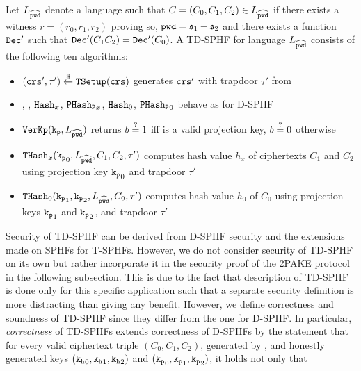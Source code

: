 \begin{definition}[TD-SPHF]\label{def:tdsphf}
Let $L_{\widehat{\mathtt{pwd}}}$ denote a language such that $C=(C_0,C_1,C_2)\in L_{\widehat{\mathtt{pwd}}}$ if there exists a witness $r=(r_0,r_1,r_2)$ proving so, $\mathtt{pwd}=\mathfrak{s}_1+\mathfrak{s}_2$ and there exists a function $\mathtt{Dec}'$ such that $\mathtt{Dec}'(C_1 C_2)=\mathtt{Dec}'(C_0)$.
A \ac{TD-SPHF} for language $L_{\widehat{\mathtt{pwd}}}$ consists of the following ten algorithms:

\begin{itemize}
	\item $(\mathtt{crs}',\tau')\stackrel{\$}{\gets}\mathtt{TSetup}(\mathtt{crs})$ generates $\mathtt{crs}'$ with trapdoor $\tau'$ from \crs

	\item \HKGen, \PKGen, $\mathtt{Hash}_x$, $\mathtt{PHash_P}_x$, $\mathtt{Hash}_0$, $\mathtt{PHash_P}_0$ behave as for \ac{D-SPHF}
	
	\item $\mathtt{VerKp}(\mathtt{k_p},L_{\widehat{\mathtt{pwd}}})$ returns $b\stackrel{?}{=} 1$ iff \hp is a valid projection key, $b\stackrel{?}{=} 0$ otherwise
	
	\item $\mathtt{THash}_x(\mathtt{k_p}_0,L_{\widehat{\mathtt{pwd}}},C_1,C_2,\tau')$ computes hash value $h_x$ of ciphertexts $C_1$ and $C_2$ using projection key $\mathtt{k_p}_0$ and trapdoor $\tau'$
	
	\item $\mathtt{THash}_0(\mathtt{k_p}_1,\mathtt{k_p}_2,L_{\widehat{\mathtt{pwd}}},C_0,\tau')$ computes hash value $h_0$ of $C_0$ using projection keys $\mathtt{k_p}_1$ and $\mathtt{k_p}_2$, and trapdoor $\tau'$
\end{itemize}
\end{definition}


\noindent
Security of \ac{TD-SPHF} can be derived from \ac{D-SPHF} security and the extensions made on \acp{SPHF} for \acp{T-SPHF}.
However, we do not consider security of \ac{TD-SPHF} on its own but rather incorporate it in the security proof of the \ac{2PAKE} protocol in the following subsection.
This is due to the fact that description of \ac{TD-SPHF} is done only for this specific application such that a separate security definition is more distracting than giving any benefit.
However, we define correctness and soundness of \ac{TD-SPHF} since they differ from the one for \ac{D-SPHF}.
In particular, \emph{correctness} of TD-SPHFs extends correctness of D-SPHFs by the statement that for every  valid ciphertext triple $(C_0,C_1,C_2)$, generated by \cL, and honestly generated keys $(\mathtt{k_h}_0,\mathtt{k_h}_1,\mathtt{k_h}_2)$ and $(\mathtt{k_p}_0,\mathtt{k_p}_1,\mathtt{k_p}_2)$, it holds not only that 

